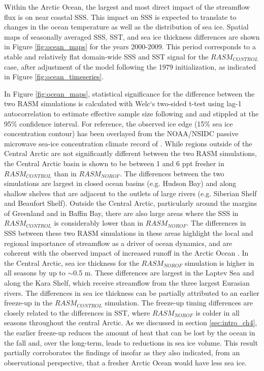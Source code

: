 Within the Arctic Ocean, the largest and most direct impact of the streamflow flux is on near coastal SSS.
This impact on SSS is expected to translate to changes in the ocean temperature as well as the distribution of sea ice.
Spatial maps of seasonally averaged SSS, SST, and sea ice thickness differences are shown in Figure \ref{fig:ocean_maps} for the years 2000-2009. This period corresponds to a stable and relatively flat domain-wide SSS and SST signal for the $RASM_{CONTROL}$ case, after adjustment of the model following the 1979 initialization, as indicated in Figure \ref{fig:ocean_timeseries}.

In Figure \ref{fig:ocean_maps}, statistical significance for the difference between the two RASM simulations is calculated with Welc`s two-sided t-test using lag-1 autocorrelation to estimate effective sample size following \citet{VonStorch1999} and \citet{Wilks2006} and stippled at the 95\% confidence interval.
For reference, the observed ice edge (15\% sea ice concentration contour) has been overlayed from the NOAA/NSIDC passive microwave sea-ice concentration climate record of \citep{Meier2013}.
While regions outside of the Central Arctic are not significantly different between the two RASM simulations, the Central Arctic basin is shown to be between 1 and 6 ppt fresher in $RASM_{CONTROL}$ than in $RASM_{NOROF}$.
The differences between the two simulations are largest in closed ocean basins (e.g. Hudson Bay) and along shallow shelves that are adjacent to the outlets of large rivers (e.g. Siberian Shelf and Beaufort Shelf).
Outside the Central Arctic, particularly around the margins of Greenland and in Baffin Bay, there are also large areas where the SSS in $RASM_{CONTROL}$ is considerably lower than in $RASM_{NOROF}$.
The differences in SSS between these two RASM simulations in these areas highlight the local and regional importance of streamflow as a driver of ocean dynamics, and are coherent with the observed impact of increased runoff in the Arctic Ocean \citep [e.g.][]{Morison_2012}.
In the Central Arctic, sea ice thickness for the $RASM_{NOROF}$ simulation is higher in all seasons by up to $\sim$0.5 m.
These differences are largest in the Laptev Sea and along the Kara Shelf, which receive streamflow from the three largest Eurasian rivers.
The differences in sea ice thickness can be partially attributed to an earlier freeze-up in the $RASM_{CONTROL}$ simulation.
The freeze-up timing differences are closely related to the differences in SST, where $RASM_{NOROF}$ is colder in all seasons throughout the central Arctic.
As we discussed in section \ref{sec:intro_ch4}, the earlier freeze-up reduces the amount of heat that can be lost by the ocean in the fall and, over the long-term, leads to reductions in sea ice volume.
This result partially corroborates the findings of \citep{Morison_2012} insofar as they also indicated, from an observational perspective, that a fresher Arctic Ocean would have less sea ice.

